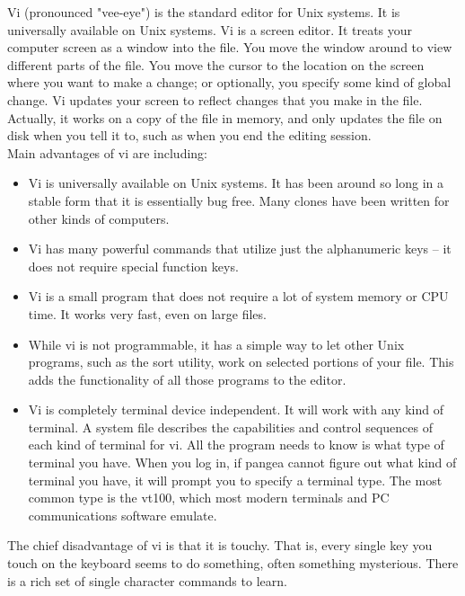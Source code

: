 \begin{information}
Vi (pronounced "vee-eye") is the standard editor for Unix systems. It is universally available on
Unix systems. Vi is a screen editor. It treats your computer screen as a window into the file. You
move the window around to view different parts of the file. You move the cursor to the location on
the screen where you want to make a change; or optionally, you specify some kind of global change.
Vi updates your screen to reflect changes that you make in the file. Actually, it works on a copy of
the file in memory, and only updates the file on disk when you tell it to, such as when you end the
editing session. \\

Main advantages of vi are including: 
\begin{itemize}
  \item Vi is universally available on Unix systems. It has been around so long in a stable form
that it is essentially bug free. Many clones have been written for other kinds of computers.
  \item Vi has many powerful commands that utilize just the alphanumeric keys -- it does not require
special function keys.
  \item Vi is a small program that does not require a lot of system memory or CPU time. It works
very fast, even on large files.
  \item While vi is not programmable, it has a simple way to let other Unix programs, such as the
sort utility, work on selected portions of your file. This adds the functionality of all those
programs to the editor.
  \item Vi is completely terminal device independent. It will work with any kind of terminal.
A system file describes the capabilities and control sequences of each kind of terminal for vi. All
the program needs to know is what type of terminal you have. When you log in, if pangea cannot
figure out what kind of terminal you have, it will prompt you to specify a terminal type. The most
common type is the vt100, which most modern terminals and PC communications software emulate.
\end{itemize}

The chief disadvantage of vi is that it is touchy. That is, every single key you touch on the
keyboard seems to do something, often something mysterious. There is a rich set of single character
commands to learn.
\end{information} 


